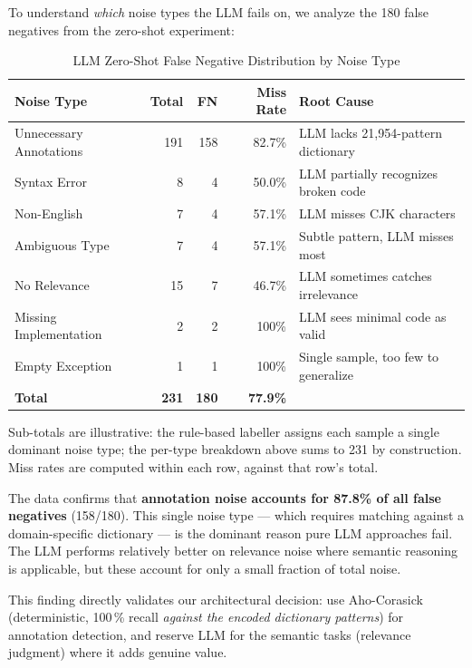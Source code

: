 \documentclass[acmlarge,nonacm,screen]{acmart}
\begin{document}
To understand \textit{which} noise types the LLM fails on, we analyze the 180 false negatives from the zero-shot experiment:

\begin{table}[htbp]
\caption{LLM Zero-Shot False Negative Distribution by Noise Type}
\label{tab:fn-by-type}
\begin{tabular}{@{}lrrrl@{}}
\toprule
\textbf{Noise Type} & \textbf{Total} & \textbf{FN} & \textbf{Miss Rate} & \textbf{Root Cause} \\
\midrule
Unnecessary Annotations & 191 & 158 & 82.7\% & LLM lacks 21,954-pattern dictionary \\
Syntax Error & 8 & 4 & 50.0\% & LLM partially recognizes broken code \\
Non-English & 7 & 4 & 57.1\% & LLM misses CJK characters \\
Ambiguous Type & 7 & 4 & 57.1\% & Subtle pattern, LLM misses most \\
No Relevance & 15 & 7 & 46.7\% & LLM sometimes catches irrelevance \\
Missing Implementation & 2 & 2 & 100\% & LLM sees minimal code as valid \\
Empty Exception & 1 & 1 & 100\% & Single sample, too few to generalize \\
\midrule
\textbf{Total} & \textbf{231} & \textbf{180} & \textbf{77.9\%} & \\
\bottomrule
\end{tabular}
\begin{flushleft}
\small Sub-totals are illustrative: the rule-based labeller assigns
each sample a single dominant noise type; the per-type breakdown
above sums to 231 by construction. Miss rates are computed within
each row, against that row's total.
\end{flushleft}
\end{table}

The data confirms that \textbf{annotation noise accounts for 87.8\% of all false negatives} (158/180). This single noise type --- which requires matching against a domain-specific dictionary --- is the dominant reason pure LLM approaches fail. The LLM performs relatively better on relevance noise where semantic reasoning is applicable, but these account for only a small fraction of total noise.

This finding directly validates our architectural decision: use Aho-Corasick (deterministic, 100\,\% recall \emph{against the encoded dictionary patterns}) for annotation detection, and reserve LLM for the semantic tasks (relevance judgment) where it adds genuine value.
\end{document}

